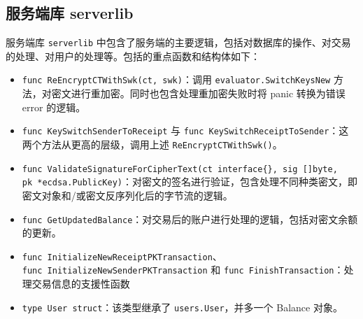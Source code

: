 \subsection{服务端库 serverlib}

服务端库 \verb|serverlib| 中包含了服务端的主要逻辑，包括对数据库的操作、对交易的处理、对用户的处理等。包括的重点函数和结构体如下：

\begin{itemize}
    \item \verb|func ReEncryptCTWithSwk(ct, swk)|：调用 \verb|evaluator.SwitchKeysNew| 方法，对密文进行重加密。同时也包含处理重加密失败时将 panic 转换为错误 error 的逻辑。
    \item \verb|func KeySwitchSenderToReceipt| 与 \verb|func KeySwitchReceiptToSender|：这两个方法从更高的层级，调用上述 \verb|ReEncryptCTWithSwk()|。
    \item \verb|func ValidateSignatureForCipherText(ct interface{}, sig []byte,|\\ 
    \verb|pk *ecdsa.PublicKey)|：对密文的签名进行验证，包含处理不同种类密文，即密文对象和/或密文反序列化后的字节流的逻辑。
    \item \verb|func GetUpdatedBalance|：对交易后的账户进行处理的逻辑，包括对密文余额的更新。
    \item \verb|func InitializeNewReceiptPKTransaction|、\\
    \verb|func InitializeNewSenderPKTransaction| 和 \verb|func FinishTransaction|：处理交易信息的支援性函数
    \item \verb|type User struct|：该类型继承了 \verb|users.User|，并多一个 Balance 对象。
\end{itemize}
